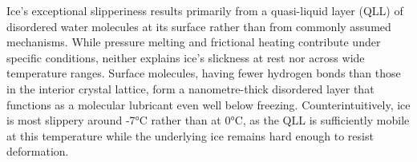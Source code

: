 Ice's exceptional slipperiness results primarily from a quasi-liquid layer (QLL) of disordered water molecules at its surface rather than from commonly assumed mechanisms. While pressure melting and frictional heating contribute under specific conditions, neither explains ice's slickness at rest nor across wide temperature ranges. Surface molecules, having fewer hydrogen bonds than those in the interior crystal lattice, form a nanometre-thick disordered layer that functions as a molecular lubricant even well below freezing. Counterintuitively, ice is most slippery around -7°C rather than at 0°C, as the QLL is sufficiently mobile at this temperature while the underlying ice remains hard enough to resist deformation.
